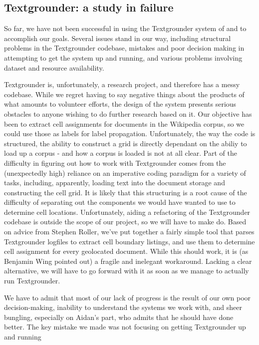 \subsection{Textgrounder: a study in failure}
So far, we have not been successful in using the Textgrounder system of
\cite{wing-baldridge:11} and \cite{rolleretal:12} to accomplish our goals. 
Several issues stand in our way, including structural problems in the
Textgrounder codebase, mistakes and poor decision making in attempting to get
the system up and running, and various problems involving dataset and resource
availability.
\par
Textgrounder is, unfortunately, a research project, and therefore has a messy
codebase.  
While we regret having to say negative things about the products of what
amounts to volunteer efforts, the design of the system presents serious
obstacles to anyone wishing to do further research based on it.
Our objective has been to extract cell assignments for documents in the
Wikipedia corpus, so we could use those as labels for label propagation.
Unfortunately, the way the code is structured, the ability to construct a grid
is directly dependant on the abiliy to load up a corpus - and how a corpus is
loaded is not at all clear.
Part of the difficulty in figuring out how to work with Textgrounder comes from
the (unexpectedly high) reliance on an imperative coding paradigm for a variety of
tasks, including, apparently, loading text into the document storage and
constructing the cell grid.
It is likely that this structuring is a root cause of the difficulty of
separating out the components we would have wanted to use to determine cell
locations.
Unfortunately, aiding a refactoring of the Textgrounder codebase is outside the
scope of our project, so we will have to make do.
Based on advice from Stephen Roller, we've put together a fairly simple tool
that parses Textgrounder logfiles to extract cell boundary listings, and use
them to determine cell assignment for every geolocated document.
While this should work, it is (as Benjamin Wing pointed out) a fragile and
inelegant workaround.
Lacking a clear alternative, we will have to go forward with it as soon as we
manage to actually run Textgrounder.
\par
We have to admit that most of our lack of progress is the result of our own
poor decision-making, inability to understand the systems we work with, and
sheer bungling, especially on Aidan's part, who admits that he should have done
better.
The key mistake we made was not focusing on getting Textgrounder up and running
